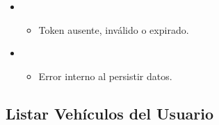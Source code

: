 \documentclass[letterpaper,10pt,spanish]{sphinxmanual}
\begin{document}
\begin{fulllineitems}
\begin{itemize}
\item {} 
\sphinxAtStartPar
{}
\begin{itemize}
\item {} 
\sphinxAtStartPar
Token ausente, inválido o expirado.

\end{itemize}

\begin{sphinxVerbatim}[commandchars=\\\{\}]
\end{sphinxVerbatim}

\item {} 
\sphinxAtStartPar
{}
\begin{itemize}
\item {} 
\sphinxAtStartPar
Error interno al persistir datos.

\end{itemize}

\end{itemize}

\end{fulllineitems}



\subsection{Listar Vehículos del Usuario}
\label{\detokenize{endpoints:listar-vehiculos-del-usuario}}
\end{document}
